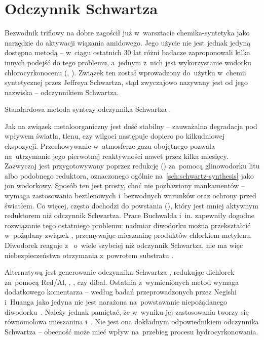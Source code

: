 \section{Odczynnik Schwartza}\label{literature:schwartz}
Bezwodnik triflowy na dobre zagościł już w~warsztacie chemika-syntetyka
  jako narzędzie do aktywacji wiązania amidowego.
Jego użycie nie jest jednak jedyną dostępna metodą \---
  w~ciągu ostatnich 30 lat różni badacze zaproponowali kilka innych podejść do tego problemu,
  a~jednym z~nich jest wykorzystanie wodorku chlorocyrkonocenu (\schwartz{}, ).
Związek ten został wprowadzony do~użytku w~chemii syntetycznej przez Jeffreya Schwartza,
  stąd zwyczajowo nazywany jest od jego nazwiska \--- odczynnikiem Schwartza.

\begin{marginscheme}
  
  \caption{Standardowa metoda syntezy odczynnika Schwartza .}
  \label{sch:schwartz-synthesis}
\end{marginscheme}
Jak na związek metaloorganiczny jest dość stabilny \--- 
  zauważalna degradacja pod wpływem światła, tlenu, czy wilgoci
  następuje dopiero po kilkudniowej ekspozycji.
Przechowywanie w~atmosferze gazu obojętnego pozwala na~utrzymanie
  jego pierwotnej reaktywności nawet przez kilka miesięcy.
Zazwyczaj jest przygotowywany poprzez redukcję \ch{[Cp2ZrCl2]} ()
  za~pomocą glinowodorku litu albo podobnego reduktora,
  oznaczonego ogólnie na~\cref{sch:schwartz-synthesis} jako jon wodorkowy.
Sposób ten jest prosty, choć nie pozbawiony mankamentów \---
  wymaga zastosowania beztlenowych i~bezwodnych warunków oraz ochrony przed światłem.
Co więcej, często dochodzi do powstania \ch{[Cp2ZrH2]} (),
  który jest mniej aktywnym reduktorem niż odczynnik Schwartza.
Prace Buchwalda i~in. zapewniły dogodne rozwiązanie tego ostatniego problemu:
  nadmiar diwodorku  można przekształcić w~pożądany związek ,
  przemywając mieszaninę produktów chlorkiem metylenu.
Diwodorek  reaguje z~ o~wiele szybciej niż odczynnik Schwartza,
  nie ma więc niebezpieczeństwa otrzymania z~powrotem substratu .

Alternatywą jest generowanie odczynnika Schwartza \insitu,
  redukując dichlorek  za~pomocą
  Red\-/Al, ,
  , czy \gls{dibal}.
Ostatnia z~wymienionych metod wymaga dodatkowego komentarza \---
  według badań przeprowadzonych przez Negishi i~Huanga
  jako jedyna nie jest narażona na~powstawanie niepożądanego diwodorku~.
Należy jednak pamiętać, że w~wyniku jej zastosowania tworzy się równomolowa mieszanina
  \schwartz{} i~.
Nie jest ona dokładnym odpowiednikiem odczynnika Schwartza \--- obecność
   może mieć wpływ na~przebieg procesu hydrocyrkonowania.

